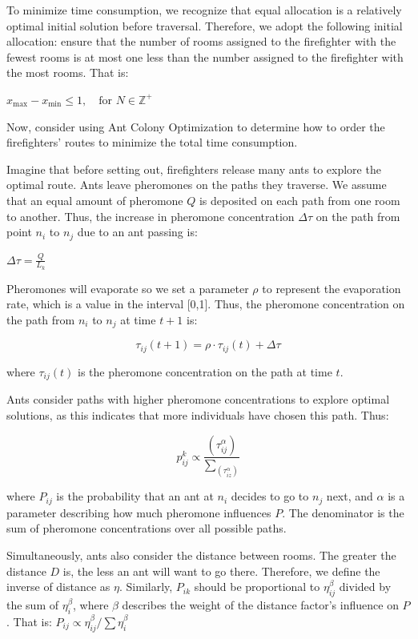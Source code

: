 To minimize time consumption, we recognize that equal allocation is a relatively optimal initial solution before traversal. Therefore, we adopt the following initial allocation: ensure that the number of rooms assigned to the firefighter with the fewest rooms is at most one less than the number assigned to the firefighter with the most rooms. That is:  

\(
x_{\text{max}} - x_{\text{min}} \leq 1, \quad \text{for } N \in \mathbb{Z}^+
\)

Now, consider using Ant Colony Optimization to determine how to order the firefighters' routes to minimize the total time consumption. 

Imagine that before setting out, firefighters release many ants to explore the optimal route. Ants leave pheromones on the paths they traverse. We assume that an equal amount of pheromone $Q$ is deposited on each path from one room to another. Thus, the increase in pheromone concentration $\Delta \tau$ on the path from point $n_i$ to $n_j$ due to an ant passing is:  

\(
\Delta \tau = \frac{Q}{L_k}
\)

Pheromones will evaporate so we set a parameter $\rho$ to represent the evaporation rate, which is a value in the interval [0,1]. Thus, the pheromone concentration on the path from $n_i$ to $n_j$ at time $t+1$ is:  

\[
\tau_{ij}(t+1) =  \rho \cdot \tau_{ij}(t) + \Delta \tau
\]

where $\tau_{ij}(t)$ is the pheromone concentration on the path at time $t$.  

Ants consider paths with higher pheromone concentrations to explore optimal solutions, as this indicates that more individuals have chosen this path. Thus:  

\[
p_{ij}^k  \propto \frac{(\tau_{ij}^\alpha)}{\sum_ (\tau_{iz}^\alpha)}
\]


where $P_{ij}$ is the probability that an ant at $n_i$ decides to go to $n_j$ next, and $\alpha$ is a parameter describing how much pheromone influences $P$. The denominator is the sum of pheromone concentrations over all possible paths.  

Simultaneously, ants also consider the distance between rooms. The greater the distance $D$ is, the less an ant will want to go there. Therefore, we define the inverse of distance as $\eta$. Similarly, $P_{ik}$ should be proportional to $\eta_{ij}^\beta$ divided by the sum of $\eta_i^\beta$, where $\beta$ describes the weight of the distance factor's influence on $P$. That is: \(P_{ij} \propto \eta_{ij}^\beta/\sum \eta_i^\beta\)

